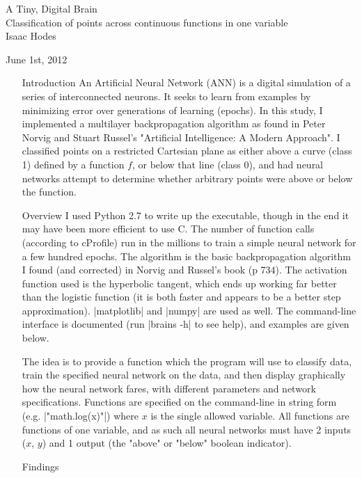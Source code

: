\documentclass[12pt]{article}
\begin{document}
\begin{center}
{\Large A Tiny, Digital Brain} \\
{\small Classification of points across continuous functions in one variable}\\
\bigskip
Isaac Hodes

June 1st, 2012
\end{center}

\begin{enumerate}
\item[Introduction]
An Artificial Neural Network (ANN) is a digital simulation of a series of interconnected neurons. It seeks to learn from examples by minimizing error over generations of learning (epochs). In this study, I implemented a multilayer backpropagation algorithm as found in Peter Norvig and Stuart Russel's "Artificial Intelligence: A Modern Approach". I classified points on a restricted Cartesian plane as either above a curve (class 1) defined by a function $f$, or below that line (class 0), and had neural networks attempt to determine whether arbitrary points were above or below the function.

\item[Overview]
I used Python 2.7 to write up the executable, though in the end it may have been more efficient to use C. The number of function calls (according to cProfile) run in the millions to train a simple neural network for a few hundred epochs. The algorithm is the basic backpropagation algorithm I found (and corrected) in Norvig and Russel's book (p 734). The activation function used is the hyperbolic tangent, which ends up working far better than the logistic function (it is both faster and appears to be a better step approximation). |matplotlib| and |numpy| are used as well. The command-line interface is documented (run |brains -h| to see help), and examples are given below.

The idea is to provide a function which the program will use to classify data, train the specified neural network on the data, and then display graphically how the neural network fares, with different parameters and network specifications. Functions are specified on the command-line in string form (e.g. |"math.log(x)"|) where $x$ is the single allowed variable. All functions are functions of one variable, and as such all neural networks must have 2 inputs ($x$, $y$) and 1 output (the "above" or "below" boolean indicator).

\item[Findings]


\end{enumerate}
\end{document}
